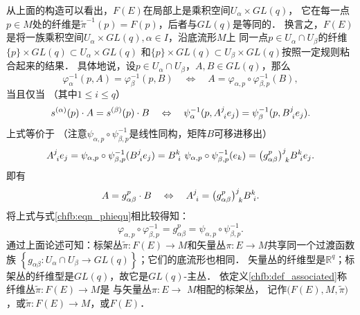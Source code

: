 从上面的构造可以看出，$F(E)$在局部上是乘积空间$U_{\alpha} \times GL(q)$，
它在每一点$p \in M$处的纤维是$\tilde{\pi}^{-1}(p)=F(p)$，后者与$GL(q)$是等同的．
换言之，$F(E)$是将一族乘积空间$U_{\alpha} \times GL(q), \alpha \in I$，沿底流形$M$上
同一点$p \in U_{\alpha} \cap U_{\beta}$的纤维$\{p\} \times GL(q) \subset U_{\alpha} \times GL(q)$
和$\{p\} \times GL(q) \subset U_{\beta} \times GL(q)$按照一定规则粘合起来的结果．
具体地说，设$p \in U_{\alpha} \cap U_{\beta}$，$ A, B \in GL(q)$，那么 
\begin{equation}\label{chfb:eqn_phiequ}
    \varphi_{\alpha}^{-1}(p, A)=\varphi_{\beta}^{-1}(p, B) 
    \quad \Leftrightarrow \quad
    A=\varphi_{\alpha, p} \circ \varphi_{\beta, p}^{-1}(B) ,
\end{equation}
当且仅当 （其中$1 \leqslant i \leqslant q $）
\begin{equation}\label{chfb:eqn_sasb}
    s^{(\alpha)}(p) \cdot A=s^{(\beta)}(p) \cdot B 
    \quad \Leftrightarrow \quad
    \psi_{\alpha}^{-1}(p, A_{\hphantom{i}i}^{j} e_{j})
    =\psi_{\beta}^{-1}(p, B_{\hphantom{i}i}^{j} e_{j}).
\end{equation}
上式等价于 （注意$\psi_{\alpha, p} \circ \psi_{\beta, p}^{-1}$是线性同构，矩阵$B$可移进移出）
\begin{equation}
    A_{\hphantom{i}i}^{j} e_{j}=\psi_{\alpha, p} \circ \psi_{\beta, p}^{-1}(B_{\hphantom{i}i}^{j}e_{j})
    =B_{\hphantom{i}i}^{k}\ \psi_{\alpha, p} \circ \psi_{\beta, p}^{-1}(e_{k})
    =\bigl(g_{\alpha \beta}^p\bigr)_{\hphantom{i}k}^{j} B_{\hphantom{i}i}^{k} e_{j} .
\end{equation}
即有 
\begin{equation}\label{chfb:eqn_agb}
    A=g_{\alpha \beta}^p \cdot B \quad \Leftrightarrow \quad
    A_{\hphantom{i}i}^{j}  = \bigl(g_{\alpha \beta}^p\bigr)_{\hphantom{i}k}^{j} B_{\hphantom{i}i}^{k}.
\end{equation}
将上式与式\eqref{chfb:eqn_phiequ}相比较得知：
\begin{equation}\label{chfb:eqn_pgp}
    \varphi_{\alpha, p} \circ \varphi_{\beta, p}^{-1}=g_{\alpha \beta}^p
    =\psi_{\alpha, p} \circ \psi_{\beta, p}^{-1}.
\end{equation}
通过上面论述可知：标架丛$\tilde{\pi}: F(E) \rightarrow M$和矢量丛$\pi: E \rightarrow M$共享同一个过渡函数族
$\left\{g_{\alpha \beta}: U_{\alpha} \cap U_{\beta} \rightarrow GL(q)\right\}$；它们的底流形也相同．
矢量丛的纤维型是$\mathbb{R}^q$；标架丛的纤维型是$GL(q)$，故它是$GL(q)$-主丛．
依定义\ref{chfb:def_associated}称纤维丛$\tilde{\pi}: F(E) \rightarrow M$是
与矢量丛$\pi: E \rightarrow$ $M$相配的{\heiti 标架丛}，
记作$\bigl(F(E), M, \tilde{\pi}\bigr)$，或$\tilde{\pi}: F(E) \rightarrow M$，或$F(E)$．



